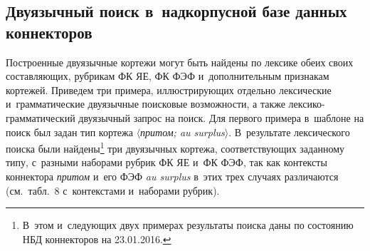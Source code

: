 \begin{multicols}{2}
\section{Двуязычный поиск в~надкорпусной базе данных коннекторов}


Построенные двуязычные кортежи могут быть найдены по лексике обеих своих составляющих, рубрикам 
ФК ЯЕ, ФК ФЭФ и~дополнительным признакам кортежей. Приведем три примера, иллюстрирующих 
отдельно лексические и~грамматические двуязычные поисковые возможности, а также  
лек\-си\-ко-грам\-ма\-ти\-че\-ский двуязычный запрос на поиск. Для первого примера в~шаблоне на поиск 
был задан тип кортежа $\langle$\textit{притом; au surplus}$\rangle$. 
В~результате лексического поиска были 
найдены\footnote{В~этом и~следующих двух примерах результаты поиска 
даны по состоянию НБД 
коннекторов на 23.01.2016.} три двуязычных кортежа, соответствующих заданному типу, 
с~разными 
наборами рубрик ФК ЯЕ и~ФК ФЭФ, так как контексты коннектора 
\textit{притом} и~его ФЭФ \textit{au 
surplus} в~этих трех случаях различаются (см.\ табл.~8 с~контекстами и~наборами рубрик).

\begin{table*}\small %
\begin{center}
\vspace*{2ex}


\end{center}
\end{table*}
\end{multicols}
